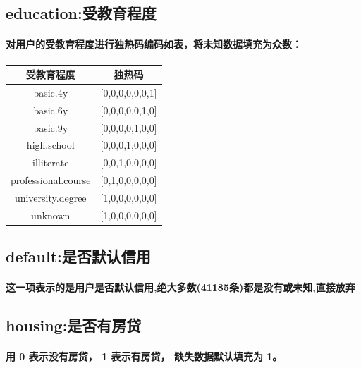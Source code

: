 \documentclass{ctexart}
\begin{document}
        \subsection{education:受教育程度}
        \paragraph{
            对用户的受教育程度进行独热码编码如表，将未知数据填充为众数：
        }
        \begin{center}
            \begin{tabular}{|c|c|}
                \hline
                受教育程度 & 独热码 \\
                \hline
                basic.4y              &[0,0,0,0,0,0,1]\\
                \hline
                basic.6y              &[0,0,0,0,0,1,0]\\
                \hline
                basic.9y              &[0,0,0,0,1,0,0]\\
                \hline
                high.school           &[0,0,0,1,0,0,0]\\
                \hline
                illiterate            &[0,0,1,0,0,0,0]\\
                \hline
                professional.course   &[0,1,0,0,0,0,0]\\
                \hline
                university.degree     &[1,0,0,0,0,0,0]\\
                \hline
                unknown               &[1,0,0,0,0,0,0]\\
                \hline
            \end{tabular}
        \end{center}
        \subsection{default:是否默认信用}
        \paragraph{
            这一项表示的是用户是否默认信用,绝大多数(41185条)都是没有或未知,直接放弃
        }
        \subsection{housing:是否有房贷}
        \paragraph{
            用 0 表示没有房贷， 1 表示有房贷， 缺失数据默认填充为 1。
        }
\end{document}
